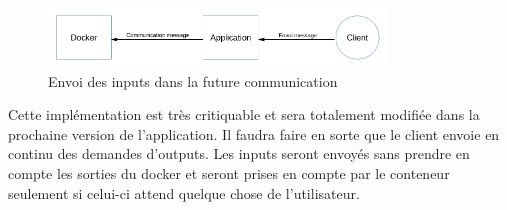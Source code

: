 \begin{figure}[H]
\centering
\includegraphics[width=0.8\textwidth]{./img/envoiinput.png}
\caption{Envoi des inputs dans la future communication}
\end{figure}

\par Cette implémentation est très critiquable et sera totalement modifiée dans la prochaine version de l'application. Il faudra faire en sorte que le client envoie en continu des demandes d'outputs. Les inputs seront envoyés sans prendre en compte les sorties du docker et seront prises en compte par le conteneur seulement si celui-ci attend quelque chose de l'utilisateur.